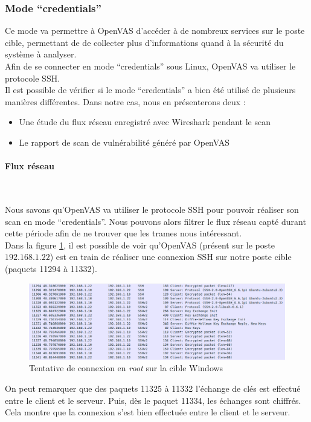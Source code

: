 \subsubsection{Mode \enquote{credentials}}
Ce mode va permettre à OpenVAS d'accéder à de nombreux services sur le poste cible, permettant de de collecter plus d'informations quand à la sécurité du système à analyser.\\
Afin de se connecter en mode \enquote{credentials} sous Linux, OpenVAS va utiliser le protocole SSH.\\
Il est possible de vérifier si le mode \enquote{credentials} a bien été utilisé de plusieurs manières différentes. Dans notre cas, nous en présenterons deux :
\begin{itemize}
 \item Une étude du flux réseau enregistré avec Wireshark pendant le scan
 \item Le rapport de scan de vulnérabilité généré par OpenVAS
\end{itemize}

\paragraph{Flux réseau}~\\\par
Nous savons qu'OpenVAS va utiliser le protocole SSH pour pouvoir réaliser son scan en mode \enquote{credentials}. Nous pouvons alors filtrer le flux réseau capté durant cette période afin de ne trouver que les trames nous intéressant.\\
Dans la figure \ref{fig:6}, il est possible de voir qu'OpenVAS (présent sur le poste $192.168.1.22$) est en train de réaliser une connexion SSH sur notre poste cible (paquets 11294 à 11332).
\begin{figure}[H]
    \centering
    \includegraphics[width=\textwidth]{img/ws5.png}
    \caption{Tentative de connexion en \textit{root} sur la cible Windows}
    \label{fig:6}
\end{figure}
On peut remarquer que des paquets 11325 à 11332 l'échange de clés est effectué entre le client et le serveur. Puis, dès le paquet 11334, les échanges sont chiffrés. Cela montre que la connexion s'est bien effectuée entre le client et le serveur.


